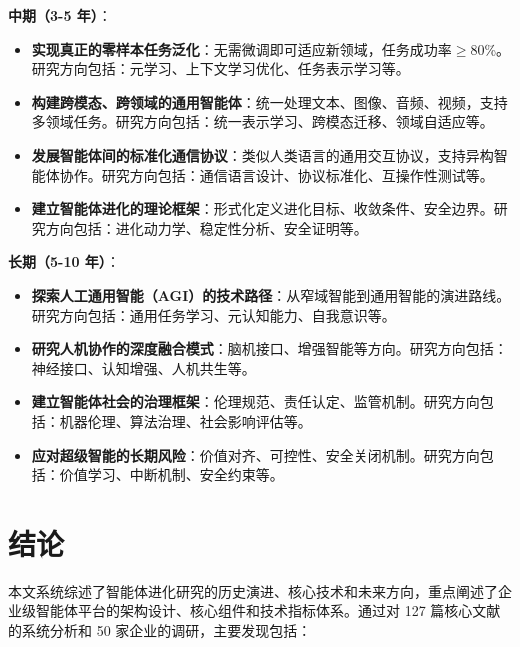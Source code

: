 \documentclass[12pt,a4paper]{article}
\begin{document}
\textbf{中期（3-5 年）}：
\begin{itemize}
    \item \textbf{实现真正的零样本任务泛化}：无需微调即可适应新领域，任务成功率$\geq$80\%。研究方向包括：元学习、上下文学习优化、任务表示学习等。
    
    \item \textbf{构建跨模态、跨领域的通用智能体}：统一处理文本、图像、音频、视频，支持多领域任务。研究方向包括：统一表示学习、跨模态迁移、领域自适应等。
    
    \item \textbf{发展智能体间的标准化通信协议}：类似人类语言的通用交互协议，支持异构智能体协作。研究方向包括：通信语言设计、协议标准化、互操作性测试等。
    
    \item \textbf{建立智能体进化的理论框架}：形式化定义进化目标、收敛条件、安全边界。研究方向包括：进化动力学、稳定性分析、安全证明等。
\end{itemize}

\textbf{长期（5-10 年）}：
\begin{itemize}
    \item \textbf{探索人工通用智能（AGI）的技术路径}：从窄域智能到通用智能的演进路线。研究方向包括：通用任务学习、元认知能力、自我意识等。
    
    \item \textbf{研究人机协作的深度融合模式}：脑机接口、增强智能等方向。研究方向包括：神经接口、认知增强、人机共生等。
    
    \item \textbf{建立智能体社会的治理框架}：伦理规范、责任认定、监管机制。研究方向包括：机器伦理、算法治理、社会影响评估等。
    
    \item \textbf{应对超级智能的长期风险}：价值对齐、可控性、安全关闭机制。研究方向包括：价值学习、中断机制、安全约束等。
\end{itemize}

\section{结论}
\label{sec:conclusion}

本文系统综述了智能体进化研究的历史演进、核心技术和未来方向，重点阐述了企业级智能体平台的架构设计、核心组件和技术指标体系。通过对 127 篇核心文献的系统分析和 50 家企业的调研，主要发现包括：
\end{document}
